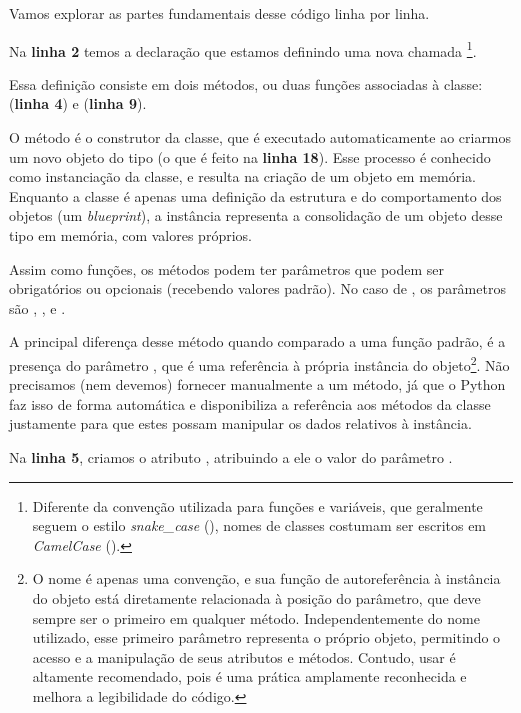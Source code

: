 Vamos explorar as partes fundamentais desse código linha por linha.

Na \textbf{linha 2} temos a declaração que estamos definindo uma nova 
chamada \footnote{Diferente da convenção utilizada para funções e variáveis, que geralmente seguem o
estilo \textit{snake\_case} (), nomes de classes costumam ser escritos em \textit{CamelCase} ().}.

Essa definição consiste em dois métodos, ou duas funções associadas à classe:  (\textbf{linha 4}) e
 (\textbf{linha 9}).

O método  é o construtor da classe, que é executado automaticamente ao criarmos um novo objeto do
tipo  (o que é feito na \textbf{linha 18}).
Esse processo é conhecido como instanciação da classe, e resulta na criação de um objeto em memória.
Enquanto a classe é apenas uma definição da estrutura e do comportamento dos objetos (um \emph{blueprint}), a instância
representa a consolidação de um objeto desse tipo em memória, com valores próprios.


Assim como funções, os métodos podem ter parâmetros que podem ser obrigatórios ou opcionais (recebendo
valores padrão).
No caso de , os parâmetros são , ,  e .

A principal diferença desse método quando comparado a uma função padrão, é a presença do parâmetro
, que é uma referência à própria instância do objeto\footnote{O nome  é apenas uma convenção, e sua função de autoreferência à instância do objeto está
diretamente relacionada à posição do parâmetro, que deve sempre ser o primeiro em qualquer método.
Independentemente do nome utilizado, esse primeiro parâmetro representa o próprio objeto, permitindo o acesso e a
manipulação de seus atributos e métodos. Contudo, usar  é altamente recomendado, pois é uma prática amplamente
reconhecida e melhora a legibilidade do código.}.
Não precisamos (nem devemos) fornecer  manualmente a um método, já que o
Python faz isso de forma automática e disponibiliza a referência  aos métodos da classe justamente para
que estes possam manipular os dados relativos à instância.

Na \textbf{linha 5}, criamos o atributo , atribuindo a ele o valor do parâmetro .

